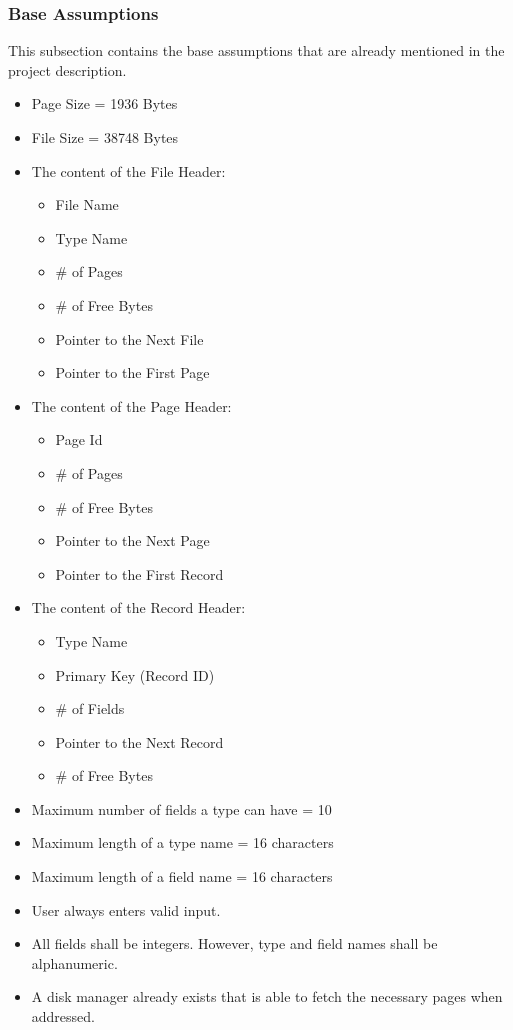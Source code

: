 \documentclass[12pt]{article}
\begin{document}
\subsubsection{\small Base Assumptions}
\tab This subsection contains the base assumptions that are already mentioned in the project description.
\begin{itemize}
    \item Page Size = 1936 Bytes
    \item File Size = 38748 Bytes
    \item The content of the File Header:
        \begin{itemize}
            \item File Name
            \item Type Name
            \item \# of Pages
            \item \# of Free Bytes
            \item Pointer to the Next File
            \item Pointer to the First Page
        \end{itemize}
    \item The content of the Page Header:
        \begin{itemize}
            \item Page Id
            \item \# of Pages
            \item \# of Free Bytes
            \item Pointer to the Next Page
            \item Pointer to the First Record
        \end{itemize}
    \item The content of the Record Header:
        \begin{itemize}
            \item Type Name
            \item Primary Key (Record ID)
            \item \# of Fields
            \item Pointer to the Next Record
            \item \# of Free Bytes
        \end{itemize}
    \item Maximum number of fields a type can have = 10
    \item Maximum length of a type name = 16 characters
    \item Maximum length of a field name = 16 characters
    \item User always enters valid input.
    \item All fields shall be integers. However, type and field names shall be alphanumeric.
    \item A disk manager already exists that is able to fetch the necessary pages when addressed.
    \end{itemize}
\end{document}
